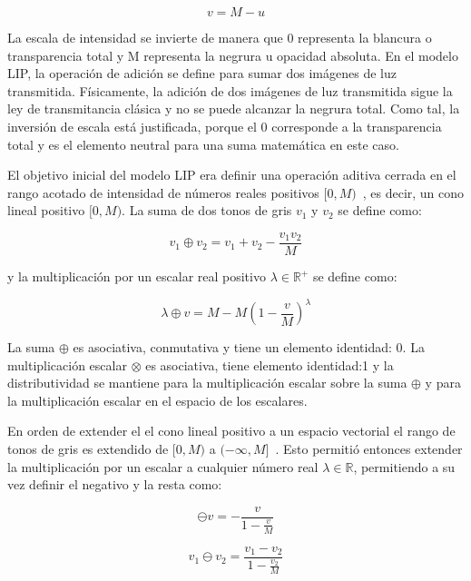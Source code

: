 \begin{equation}
	v = M - u
\end{equation}

La escala de intensidad se invierte de manera que 0 representa la blancura o transparencia total y M representa la negrura u opacidad absoluta. En el modelo LIP, la operación de adición se define para sumar dos imágenes de luz transmitida. Físicamente, la adición de dos imágenes de luz transmitida sigue la ley de transmitancia clásica y no se puede alcanzar la negrura total. Como tal, la inversión de escala está justificada, porque el 0 corresponde a la transparencia total y es el elemento neutral para una suma matemática en este caso.

El objetivo inicial del modelo LIP era definir una operación aditiva cerrada en el rango acotado de intensidad de números reales positivos $[0, M)$~\cite{jourlin1988model}, es decir, un cono lineal positivo $[0, M )$. La suma de dos tonos de gris $v_1$ y $v_2$ se define como:

\begin{equation}
	v_1\oplus v_2=v_1+v_2-\frac{v_1v_2}{M}
\end{equation}

y la multiplicación por un escalar real positivo $\lambda \in \mathbb{R}^+$ se define como:

\begin{equation}
	\lambda \oplus v = M - M\left(1-\frac{v}{M}\right)^\lambda
\end{equation}

La suma $\oplus$ es asociativa, conmutativa y tiene un elemento identidad: 0. La multiplicaci\'on escalar $\otimes$ es asociativa, tiene elemento identidad:1 y la distributividad se mantiene para la multiplicación escalar sobre la suma $\oplus$ y para la multiplicación escalar en el espacio de los escalares.

En orden de extender el el cono lineal positivo a un espacio vectorial el rango de tonos de gris es
extendido de $[0,M)$ a $(-\infty,M]$~\cite{jourlin2016logarithmic}. Esto permiti\'o entonces extender la multiplicaci\'on por un escalar a cualquier n\'umero real $\lambda \in \mathbb{R}$, permitiendo a su vez definir el negativo y la resta como:

\begin{equation}
	\ominus v=-\frac{v}{1-\frac{v}{M}}
\end{equation}

\begin{equation}
	v_1 \ominus v_2 = \frac{v_1-v_2}{1-\frac{v_2}{M}}
\end{equation}

